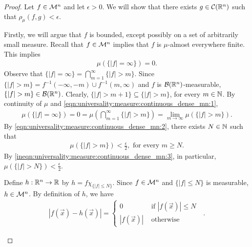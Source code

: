 \begin{proof}
Let $f \in {\mathcal M}^n$ and let $\epsilon > 0$. We will show that there exists $g \in {\mathcal C}({\mathbb R}^n)$ such that $\rho_\mu (f, g) < \epsilon$.
\setcounter{step}{0}
\begin{step}
Firstly, we will argue that $f$ is bounded, except possibly on a set of arbitrarily small measure. Recall that $f \in {\mathcal M}^n$ implies that $f$
is $\mu$-almost everywhere finite. This implies \begin{align}
    \label{eqn:universality:measure:continuous_dense_mn:1}
    \mu(\{ |f| = \infty \}) = 0.
\end{align}
Observe that $\{ |f| = \infty \} = \bigcap_{m=1}^\infty \{ |f| > m \}$. Since $\{ |f| > m \} = f^{-1}(-\infty, -m) \cup f^{-1}(m, \infty)$ and $f$ is ${\mathcal B}({\mathbb R}^n)$-measurable, $\{ |f| > m \} \in {\mathcal B}({\mathbb R}^n)$. Clearly, $\{ |f| > m + 1\} \subseteq \{ |f| > m \}$, for every $m \in {\mathbb N}$. By continuity of $\mu$ and \ref{eqn:universality:measure:continuous_dense_mn:1}, 
\begin{align}
    \label{eqn:universality:measure:continuous_dense_mn:2}
    \mu(\{ |f| = \infty \}) = 0 = \mu \left( \bigcap_{m=1}^\infty \{ |f| > m \} \right) = \lim_{m \to \infty} \mu ( \{ |f| > m \}).
\end{align}
By \ref{eqn:universality:measure:continuous_dense_mn:2}, there exists $N \in {\mathbb N}$ such that \begin{align}
    \label{ineqn:universality:measure:continuous_dense_mn:3}
    \mu (\{ |f| > m \}) < \frac{\epsilon}{2}, \text{ for every $m \geq N$.}
\end{align}
By \ref{ineqn:universality:measure:continuous_dense_mn:3}, in particular, $\mu (\{ |f| > N \}) < \frac{\epsilon}{2}$.
\end{step}
\begin{step}
Define $h : {\mathbb R}^n \to {\mathbb R}$ by $h = f \chi_{\{ |f| \leq N \}}$. Since $f \in {\mathcal M}^n$ and $\{ |f| \leq N \}$ is measurable, $h \in {\mathcal M}^n$. By definition of $h$, we have \begin{align}
    \label{eqn:universality:measure:continuous_dense_mn:4}
    | f(\vec{x}) - h(\vec{x}) | = \begin{cases}
      0 & \text{ if $|f(\vec{x})| \leq N$ } \\
      |f(\vec{x})| & \text{ otherwise }
    \end{cases}.
\end{align}
\begin{subequations}\label{ineqn:universality:measure:continuous_dense_mn:8}

\end{subequations}
\end{step}
\end{proof}
